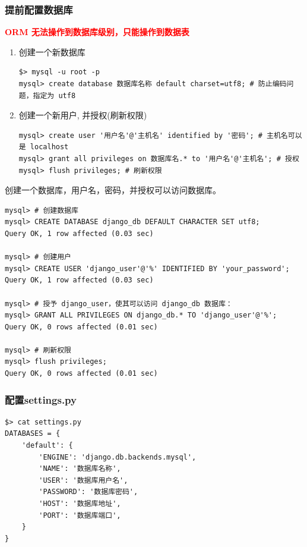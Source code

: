 \subsubsection{提前配置数据库}
\textcolor{red}{\textbf{ORM 无法操作到数据库级别，只能操作到数据表}}
\begin{enumerate}[label=\arabic*)]
    \item 创建一个新数据库
\begin{lstlisting}[style=demostyle,numbers=none]
$> mysql -u root -p
mysql> create database 数据库名称 default charset=utf8; # 防止编码问题，指定为 utf8
\end{lstlisting}

    \item 创建一个新用户, 并授权(刷新权限)
\begin{lstlisting}[style=demostyle,numbers=none]
mysql> create user '用户名'@'主机名' identified by '密码'; # 主机名可以是 localhost
mysql> grant all privileges on 数据库名.* to '用户名'@'主机名'; # 授权
mysql> flush privileges; # 刷新权限
\end{lstlisting}

\end{enumerate}

\begin{example}
    \exProblem
    创建一个数据库，用户名，密码，并授权可以访问数据库。
    \exSolution
\begin{lstlisting}[style=demostyle,numbers=none]
mysql> # 创建数据库    
mysql> CREATE DATABASE django_db DEFAULT CHARACTER SET utf8; 
Query OK, 1 row affected (0.03 sec)

mysql> # 创建用户
mysql> CREATE USER 'django_user'@'%' IDENTIFIED BY 'your_password';
Query OK, 1 row affected (0.03 sec)

mysql> # 授予 django_user，使其可以访问 django_db 数据库：
mysql> GRANT ALL PRIVILEGES ON django_db.* TO 'django_user'@'%';
Query OK, 0 rows affected (0.01 sec)

mysql> # 刷新权限
mysql> flush privileges;
Query OK, 0 rows affected (0.01 sec)
\end{lstlisting}
\end{example}


\subsubsection{配置settings.py}
\begin{lstlisting}[style=demostyle,numbers=none]
$> cat settings.py    
DATABASES = {
    'default': {
        'ENGINE': 'django.db.backends.mysql',
        'NAME': '数据库名称',
        'USER': '数据库用户名',
        'PASSWORD': '数据库密码',
        'HOST': '数据库地址',
        'PORT': '数据库端口',
    }
}
\end{lstlisting}


